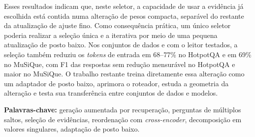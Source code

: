 \begin{resumo}
Esses resultados indicam que, neste seletor, a capacidade de usar a evidência já escolhida está contida numa alteração de pesos compacta, separável do restante da atualização de ajuste fino. Como consequência prática, um único seletor poderia realizar a seleção única e a iterativa por meio de uma pequena atualização de posto baixo. Nos conjuntos de dados e com o leitor testados, a seleção também reduziu os \textit{tokens} de entrada em 68--77\% no HotpotQA e em 69\% no MuSiQue, com F1 das respostas sem redução mensurável no HotpotQA e maior no MuSiQue. O trabalho restante treina diretamente essa alteração como um adaptador de posto baixo, aprimora o roteador, estuda a geometria da alteração e testa sua transferência entre conjuntos de dados e modelos.

\textbf{Palavras-chave:} geração aumentada por recuperação, perguntas de múltiplos saltos, seleção de evidências, reordenação com \textit{cross-encoder}, decomposição em valores singulares, adaptação de posto baixo.
\end{resumo}

